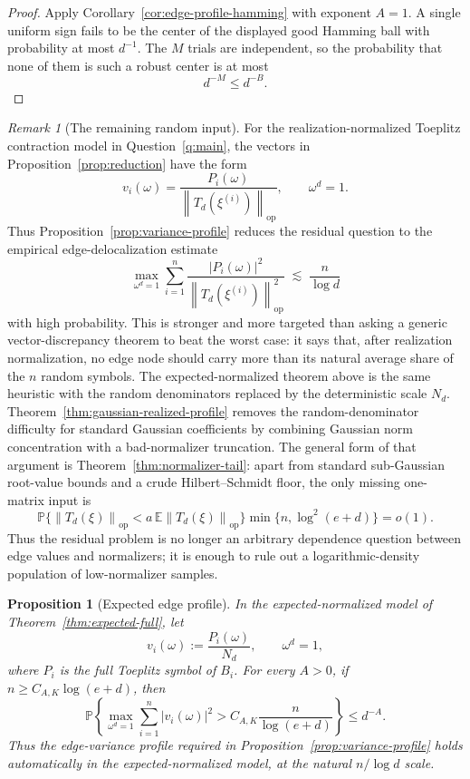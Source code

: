 \documentclass[11pt]{amsart}
\numberwithin{equation}{section}
\newtheorem{proposition}[theorem]{Proposition}
\theoremstyle{definition}
\theoremstyle{remark}
\newtheorem{remark}[theorem]{Remark}
\newcommand{\op}{\mathrm{op}}
\newcommand{\Prob}{\mathbb P}
\newcommand{\Exp}{\mathbb E}
\newcommand{\norm}[1]{\left\lVert #1\right\rVert}
\newcommand{\abs}[1]{\left\lvert #1\right\rvert}
\begin{document}
\begin{proof}
Apply Corollary~\ref{cor:edge-profile-hamming} with exponent \(A=1\).  A single
uniform sign fails to be the center of the displayed good Hamming ball with
probability at most \(d^{-1}\).  The \(M\) trials are independent, so the
probability that none of them is such a robust center is at most
\[
  d^{-M}\le d^{-B}.
\]
\end{proof}

\begin{remark}[The remaining random input]\label{rem:variance-profile}
For the realization-normalized Toeplitz contraction model in
Question~\ref{q:main}, the vectors in Proposition~\ref{prop:reduction} have the
form
\[
  v_i(\omega)=\frac{P_i(\omega)}{\norm{T_d(\xi^{(i)})}_{\op}},
  \qquad \omega^d=1 .
\]
Thus Proposition~\ref{prop:variance-profile} reduces the residual question to
the empirical edge-delocalization estimate
\[
  \max_{\omega^d=1}
  \sum_{i=1}^n
  \frac{\abs{P_i(\omega)}^2}
       {\norm{T_d(\xi^{(i)})}_{\op}^2}
  \;\lesssim\; \frac{n}{\log d}
\]
with high probability.  This is stronger and more targeted than asking a
generic vector-discrepancy theorem to beat the worst case: it says that, after
realization normalization, no edge node should carry more than its natural
average share of the \(n\) random symbols.  The expected-normalized theorem
above is the same heuristic with the random denominators replaced by the
deterministic scale \(N_d\).  Theorem~\ref{thm:gaussian-realized-profile}
removes the random-denominator difficulty for standard Gaussian coefficients by
combining Gaussian norm concentration with a bad-normalizer truncation.  The
general form of that argument is Theorem~\ref{thm:normalizer-tail}: apart from
standard sub-Gaussian root-value bounds and a crude Hilbert--Schmidt floor, the
only missing one-matrix input is
\[
  \Prob\{\norm{T_d(\xi)}_{\op}<a\,\Exp\norm{T_d(\xi)}_{\op}\}
  \min\{n,\log^2(e+d)\}=o(1).
\]
Thus the residual problem is no longer an arbitrary dependence question between
edge values and normalizers; it is enough to rule out a logarithmic-density
population of low-normalizer samples.
\end{remark}

\begin{proposition}[Expected edge profile]\label{prop:expected-profile}
In the expected-normalized model of Theorem~\ref{thm:expected-full}, let
\[
  v_i(\omega):=\frac{P_i(\omega)}{N_d},\qquad \omega^d=1,
\]
where \(P_i\) is the full Toeplitz symbol of \(B_i\).  For every \(A>0\), if
\(n\ge C_{A,K}\log(e+d)\), then
\[
  \Prob\left\{
    \max_{\omega^d=1}\sum_{i=1}^n \abs{v_i(\omega)}^2
    > C_{A,K}\frac{n}{\log(e+d)}
  \right\}\le d^{-A}.
\]
Thus the edge-variance profile required in
Proposition~\ref{prop:variance-profile} holds automatically in the
expected-normalized model, at the natural \(n/\log d\) scale.
\end{proposition}
\end{document}
